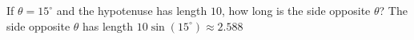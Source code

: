 {If $\theta = 15^{\circ}$ and the hypotenuse has length $10$, how long is the side opposite $\theta$?}
{The side opposite $\theta$ has length $10 \sin(15^{\circ}) \approx 2.588$}
